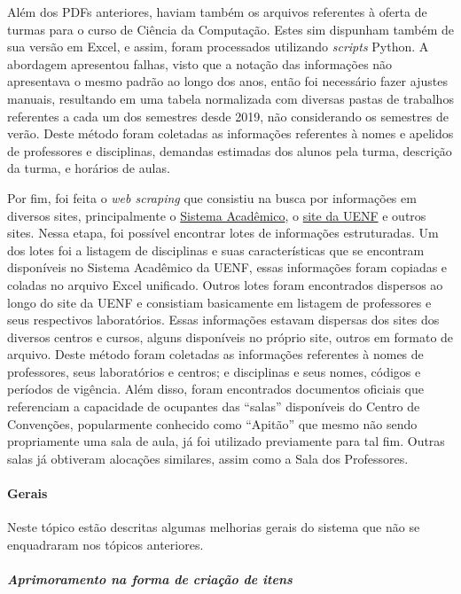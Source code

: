 Além dos PDFs anteriores, haviam também os arquivos referentes à oferta de turmas para o curso de Ciência da Computação. Estes sim dispunham também de sua versão em Excel, e assim, foram processados utilizando \textit{scripts} Python. A abordagem apresentou falhas, visto que a notação das informações não apresentava o mesmo padrão ao longo dos anos, então foi necessário fazer ajustes manuais, resultando em uma tabela normalizada com diversas pastas de trabalhos referentes a cada um dos semestres desde 2019, não considerando os semestres de verão. Deste método foram coletadas as informações referentes à nomes e apelidos de professores e disciplinas, demandas estimadas dos alunos pela turma, descrição da turma, e horários de aulas.

Por fim, foi feita o \textit{web scraping} que consistiu na busca por informações em diversos sites, principalmente o \href{https://academico.uenf.br/usuarios/sign_in}{Sistema Acadêmico}, o \href{https://uenf.br/portal/}{site da UENF} e outros sites. Nessa etapa, foi possível encontrar lotes de informações estruturadas. Um dos lotes foi a listagem de disciplinas e suas características que se encontram disponíveis no Sistema Acadêmico da UENF, essas informações foram copiadas e coladas no arquivo Excel unificado. Outros lotes foram encontrados dispersos ao longo do site da UENF e consistiam basicamente em listagem de professores e seus respectivos laboratórios. Essas informações estavam dispersas dos sites dos diversos centros e cursos, alguns disponíveis no próprio site, outros em formato de arquivo. Deste método foram coletadas as informações referentes à nomes de professores, seus laboratórios e centros; e disciplinas e seus nomes, códigos e períodos de vigência. Além disso, foram encontrados documentos oficiais que referenciam a capacidade de ocupantes das ``salas'' disponíveis do Centro de Convenções, popularmente conhecido como ``Apitão'' que mesmo não sendo propriamente uma sala de aula, já foi utilizado previamente para tal fim. Outras salas já obtiveram alocações similares, assim como a Sala dos Professores.

\paragraph*{Gerais}

Neste tópico estão descritas algumas melhorias gerais do sistema que não se enquadraram nos tópicos anteriores.

\subparagraph*{Aprimoramento na forma de criação de itens}

